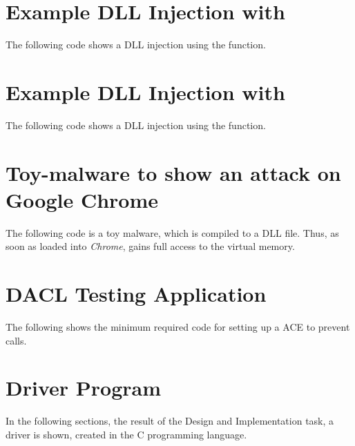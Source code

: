 \begin{appendices}
\label{sec:appendix}
\section{Example DLL Injection with }
\label{appendix:setwindowshookex}
The following code shows a \gls{DLL} injection using the  function.


\section{Example DLL Injection with }
\label{appendix:writeprocessmemory}
The following code shows a \gls{DLL} injection using the  function.


\section{Toy-malware to show an attack on Google Chrome}
\label{appendix:toymalware}
The following code is a toy malware, which is compiled to a \gls{DLL} file. Thus, as soon as loaded into \emph{Chrome}, gains full access to the virtual memory.


\section{DACL Testing Application}
\label{appendix:dacl}
The following shows the minimum required code for setting up a \gls{ACE} to prevent  calls.


\section{Driver Program}
\label{appendix:driver}
In the following sections, the result of the Design and Implementation task, a driver is shown, created in the C programming language.

\end{appendices}